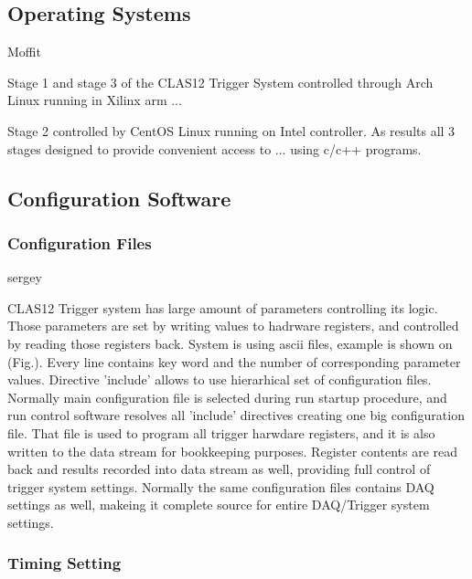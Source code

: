 \subsection{Operating Systems} Moffit

Stage 1 and stage 3 of the CLAS12 Trigger System controlled through Arch Linux running in Xilinx arm ...

Stage 2 controlled by CentOS Linux running on Intel controller. As results all 3 stages designed to provide convenient access to ...
using c/c++ programs.




\subsection{Configuration Software}

\subsubsection{Configuration Files} sergey

CLAS12 Trigger system has large amount of parameters controlling its logic. Those parameters are set by writing values to hadrware registers, and controlled by reading those registers back. System is using ascii files, example is shown on (Fig.). Every line contains key word and the number of corresponding parameter values. Directive 'include' allows to use hierarhical set of configuration files. Normally main configuration file is selected during run startup procedure, and run control software resolves all 'include' directives creating one big configuration file. That file is used to program all trigger harwdare registers, and it is also written to the data stream for bookkeeping purposes. Register contents are read back and results recorded into data stream as well, providing full control of trigger system settings. Normally the same configuration files contains DAQ settings as well, makeing it complete source for entire DAQ/Trigger system settings.


\subsubsection{Timing Setting}

